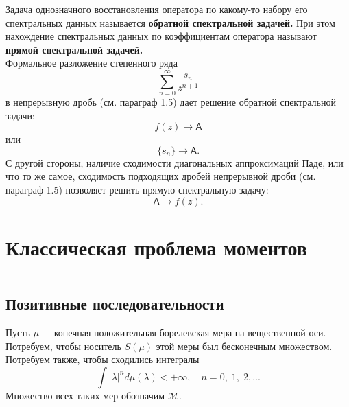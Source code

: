 \documentclass[12 pt, a4 paper]{article}
\theoremstyle{plain}   \newtheorem{Pro}{Задача}
\begin{document}
Задача однозначного восстановления оператора по
какому-то набору его спектральных данных называется
{\bfseries обратной спектральной задачей.}
При этом нахождение спектральных данных по коэффициентам
оператора называют
{\bfseries прямой спектральной задачей.} \\

Формальное разложение степенного ряда
$$
  \sum _{n=0}^{\infty}
    \frac{s_n}{z^{n+1}}
$$
в непрерывную дробь (см. параграф 1.5) дает решение
обратной спектральной задачи:
$$
  f(z) \longrightarrow \mathsf{A}
$$
или
$$
  \{ s_n \} \longrightarrow \mathsf{A}.
$$
С другой стороны, наличие сходимости диагональных аппроксимаций
Паде, или что то же самое, сходимость подходящих дробей
непрерывной дроби (см. параграф 1.5) позволяет решить прямую
спектральную задачу:
$$
  \mathsf{A} \longrightarrow f(z).
$$
\newpage
\section{Классическая проблема моментов}
$ \; $ \\
$ \; $ \\

\subsection{Позитивные последовательности}
$ \; $ \\

Пусть
$ \mu - $
конечная положительная борелевская мера на вещественной оси.
Потребуем, чтобы носитель
$ S( \mu ) $
этой меры был бесконечным множеством. Потребуем также, чтобы
сходились интегралы
$$
  \int | \lambda |^n d \mu ( \lambda ) < + \infty ,
  \quad n=0, \; 1, \; 2,...
$$
Множество всех таких мер обозначим
$ \mathcal{M} .$
\\
\end{document}
